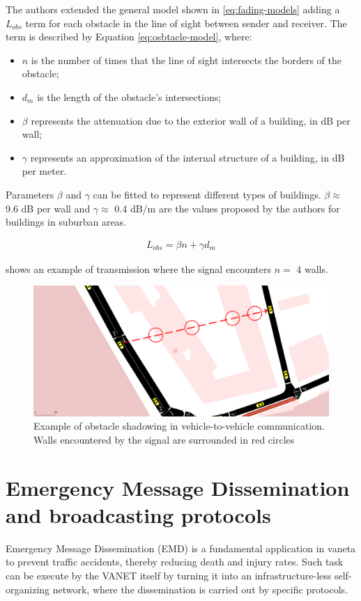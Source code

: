		The authors extended the general model shown in \ref{eq:fading-models} adding a $L_{obs}$ term for each obstacle in the line of sight between sender and receiver. The term is described by Equation \ref{eq:osbtacle-model}, where:
		\begin{itemize}
			\item $n$ is the number of times that the line of sight intersects the borders of the obstacle;
			\item $d_m$ is the length of the obstacle's intersections;
			\item $\beta$ represents the attenuation due to the exterior wall of a building, in dB per wall;
			\item $\gamma$ represents an approximation of the internal structure of a building, in dB per meter.
		\end{itemize}
		
		
		Parameters $\beta$ and $\gamma$ can be fitted to represent different types of buildings. $\beta \approx$ 9.6 dB per wall and $\gamma \approx$ 0.4 dB/m are the values proposed by the authors for buildings in suburban areas.
		
		\begin{gather}\label{eq:osbtacle-model}
			L_{obs} = \beta n + \gamma d_m
		\end{gather}
	
		 shows an example of transmission where the signal encounters $n =$ 4 walls. 
	
		\begin{figure}[H]
			\centering
			\includegraphics[width=\textwidth]{immagini/sumo-obstacle}
			\caption{Example of obstacle shadowing in vehicle-to-vehicle communication. Walls encountered by the signal are surrounded in red circles}
			\label{fig:sumo-obstacle}
		\end{figure}
	
	\section{Emergency Message Dissemination and broadcasting protocols}
		\label{sec:emd}
		Emergency Message Dissemination (EMD) is a fundamental application in \acrshort{vaneta} to prevent traffic accidents, thereby reducing death and injury rates. Such task can be execute by the VANET itself by turning it into an infrastructure-less self-organizing network, where the dissemination is carried out by specific protocols. 
		
